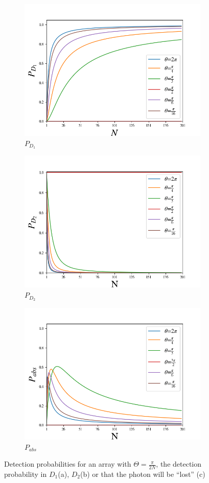 \documentclass{book}
\begin{document}
 
\begin{figure}[H]
\centering
\begin{subfigure}[b]{0.45\linewidth}
\includegraphics[width=\linewidth,height=5 cm]{images/BS_Azuna.png}
\caption{$P_{D_{1}}$}
\label{fig:BS1}
\end{subfigure}
\begin{subfigure}[b]{0.45\linewidth}
\includegraphics[width=\linewidth,height=5 cm]{images/BS_AzunaD2.png}
\caption{$P_{D_{2}}$}
\label{fig:westminster_aerea}
\end{subfigure}
\begin{subfigure}[b]{0.45\linewidth}
\includegraphics[width=\linewidth,height=5 cm]{images/absorbido_azuna.png}
\caption{$P_{abs}$}
\label{fig:BS1}
\end{subfigure}
\caption{Detection probabilities for an array with $\Theta=\frac{\pi}{2N}$, the detection probability in $D_{1}$(a), $D_{2}$(b) or that the photon will be ``lost'' (c) }
\label{Azuma1}
\end{figure}
\end{document}
